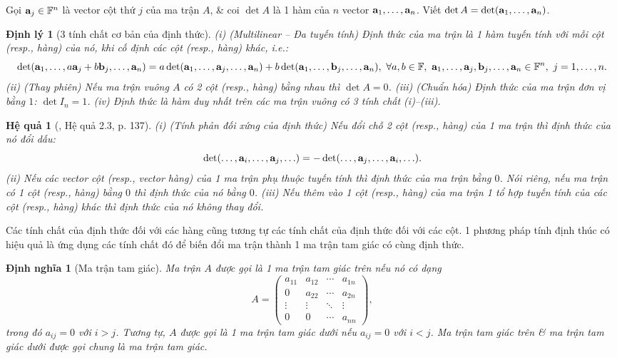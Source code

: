 \documentclass{article}
\newtheorem{dinhly}{Định lý}
\newtheorem{dinhnghia}{Định nghĩa}
\newtheorem{hequa}{Hệ quả}
\begin{document}
Gọi ${\bf a}_j\in\mathbb{F}^n$ là vector cột thứ $j$ của ma trận $A$, \& coi $\det A$ là 1 hàm của $n$ vector ${\bf a}_1,\ldots,{\bf a}_n$. Viết $\det A = \det({\bf a}_1,\ldots,{\bf a}_n)$.

\begin{dinhly}[3 tính chất cơ bản của định thức]
	(i) {\rm(Multilinear -- Đa tuyến tính)} Định thức của ma trận là 1 hàm tuyến tính với mỗi cột (resp., hàng) của nó, khi cố định các cột (resp., hàng) khác, i.e.:
	\begin{equation*}
		\det({\bf a}_1,\ldots,a{\bf a}_j + b{\bf b}_j,\ldots,{\bf a}_n) = a\det({\bf a}_1,\ldots,{\bf a}_j,\ldots,{\bf a}_n) + b\det({\bf a}_1,\ldots,{\bf b}_j,\ldots,{\bf a}_n),\ \forall a,b\in\mathbb{F},\ {\bf a}_1,\ldots,{\bf a}_j,{\bf b}_j,\ldots,{\bf a}_n\in\mathbb{F}^n,\ j = 1,\ldots,n.
	\end{equation*}
	(ii) {\rm(Thay phiên)} Nếu ma trận vuông $A$ có 2 cột (resp., hàng) bằng nhau thì $\det A = 0$. (iii) {\rm(Chuẩn hóa)} Định thức của ma trận đơn vị bằng $1$: $\det I_n = 1$. (iv) Định thức là hàm duy nhất trên các ma trận vuông có 3 tính chất (i)--(iii).
\end{dinhly}

\begin{hequa}[\cite{Hung_linear_algebra}, Hệ quả 2.3, p. 137]
	(i) {\rm(Tính phản đối xứng của định thức)} Nếu đổi chỗ 2 cột (resp., hàng) của 1 ma trận thì định thức của nó đổi dấu:
	\begin{equation*}
		\det(\ldots,{\bf a}_i,\ldots,{\bf a}_j,\ldots) = -\det(\ldots,{\bf a}_j,\ldots,{\bf a}_i,\ldots).
	\end{equation*}
	(ii) Nếu các vector cột (resp., vector hàng) của 1 ma trận phụ thuộc tuyến tính thì định thức của ma trận bằng $0$. Nói riêng, nếu ma trận có 1 cột (resp., hàng) bằng $0$ thì định thức của nó bằng $0$. (iii) Nếu thêm vào 1 cột (resp., hàng) của ma trận 1 tổ hợp tuyến tính của các cột (resp., hàng) khác thì định thức của nó không thay đổi.
\end{hequa}
Các tính chất của định thức đối với các hàng cũng tương tự các tính chất của định thức đối với các cột. 1 phương pháp tính định thúc có hiệu quả là ứng dụng các tính chất đó để biến đổi ma trận thành 1 ma trận tam giác có cùng định thức.

\begin{dinhnghia}[Ma trận tam giác]
	Ma trận $A$ được gọi là 1 {\rm ma trận tam giác trên} nếu nó có dạng
	\begin{equation*}
		A = \begin{pmatrix}
			a_{11} & a_{12} & \cdots & a_{1n}\\0 & a_{22} & \cdots & a_{2n}\\
			\vdots & \vdots & \ddots & \vdots\\0 & 0 & \cdots & a_{nn}
		\end{pmatrix},
	\end{equation*}
	trong đó $a_{ij} = 0$ với $i > j$. Tương tự, $A$ được gọi là 1 {\rm ma trận tam giác dưới} nếu $a_{ij} = 0$ với $i < j$. Ma trận tam giác trên \& ma trận tam giác dưới được gọi chung là {\rm ma trận tam giác}.
\end{dinhnghia}
\end{document}
